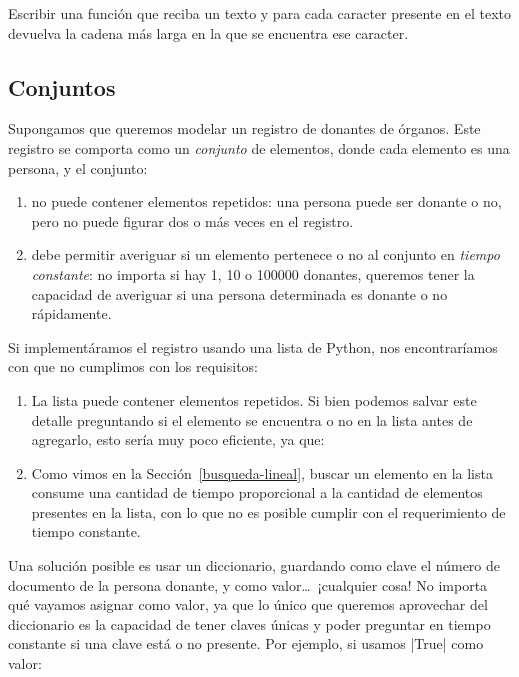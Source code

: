 \begin{ejercicio}
Escribir una función que reciba un texto y para cada caracter presente en el
texto devuelva la cadena más larga en la que se encuentra ese caracter.
\end{ejercicio}

\newpage
\begin{subappendices}
\section{Conjuntos}

Supongamos que queremos modelar un registro de donantes de órganos.
Este registro se comporta como un \emph{conjunto} de elementos, donde cada
elemento es una persona, y el conjunto:

\begin{enumerate}
    \item no puede contener elementos repetidos: una persona puede ser donante
        o no, pero no puede figurar dos o más veces en el registro.
    \item debe permitir averiguar si un elemento pertenece o no al conjunto en
        \emph{tiempo constante}: no importa si hay 1, 10 o 100000 donantes,
        queremos tener la capacidad de averiguar si una persona determinada
        es donante o no rápidamente.
\end{enumerate}

Si implementáramos el registro usando una lista de Python, nos encontraríamos
con que no cumplimos con los requisitos:

\begin{enumerate}
    \item La lista puede contener elementos repetidos. Si bien podemos salvar este
        detalle preguntando si el elemento se encuentra o no en la lista antes
        de agregarlo, esto sería muy poco eficiente, ya que:
    \item Como vimos en la Sección~\ref{busqueda-lineal}, buscar un elemento en la
        lista consume una cantidad de tiempo proporcional a la cantidad de
        elementos presentes en la lista, con lo que no es posible cumplir con
        el requerimiento de tiempo constante.
\end{enumerate}

Una solución posible es usar un diccionario, guardando como clave el número de
documento de la persona donante, y como valor\ldots\ ¡cualquier cosa! No
importa qué vayamos asignar como valor, ya que lo único que queremos aprovechar
del diccionario es la capacidad de tener claves únicas y poder preguntar en
tiempo constante si una clave está o no presente. Por ejemplo, si usamos |True|
como valor:


\end{subappendices}
